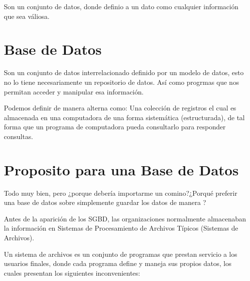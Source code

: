 \documentclass[12pt, fleqn]{report}                             %
\newcommand \Quote              {\qq}                           %
\theoremstyle{break}                                            %
\begin{document}
            Son un conjunto de datos, donde definio a un dato como cualquier información
            que sea váliosa.


        \section{Base de Datos}

            Son un conjunto de datos interrelacionado definido por un modelo de datos, esto no lo
            tiene necesariamente un repositorio de datos. Así como progrmas que nos permitan acceder
            y manipular esa información.

            Podemos definir de manera alterna como: Una colección de registros el cual es almacenada
            en una computadora de una forma sistemática (estructurada), de tal forma que un programa
            de computadora pueda consultarlo para responder consultas.



        \section{Proposito para una Base de Datos}

            Todo muy bien, pero ¿porque debería importarme un comino?¿Porqué preferir una base de datos
            sobre simplemente guardar los datos de manera \Quote{común}?

            Antes de la aparición de los SGBD, las organizaciones normalmente almacenaban la
            información en Sistemas de Procesamiento de Archivos Típicos (Sistemas de Archivos).

            Un sistema de archivos es un conjunto de programas que prestan servicio a los usuarios
            finales, donde cada programa define y maneja sus propios datos, los cuales presentan
            los siguientes inconvenientes:
\end{document}
